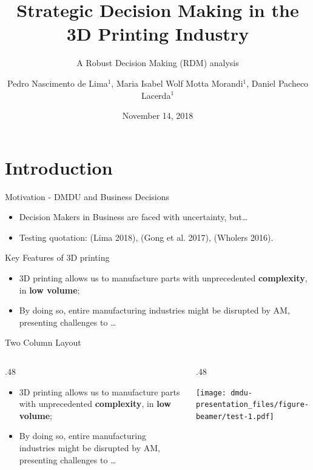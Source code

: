 \documentclass[12pt,ignorenonframetext,]{beamer}
\title{Strategic Decision Making in the 3D Printing Industry}
\subtitle{A Robust Decision Making (RDM) analysis}
\author{Pedro Nascimento de Lima\(^1\), Maria Isabel Wolf Motta Morandi\(^1\),
Daniel Pacheco Lacerda\(^1\)}
\institute{\(^1\) GMAP Research Group, UNISINOS University, RS, Brazil}
\date{November 14, 2018}
\providecommand{\tightlist}{%
  \setlength{\itemsep}{0pt}\setlength{\parskip}{0pt}}
\def\begincols{\begin{columns}}
\def\begincol{\begin{column}}
\def\endcol{\end{column}}
\def\endcols{\end{columns}}
\begin{document}
\frame{\titlepage}

\section{Introduction}\label{introduction}

\begin{frame}{Motivation - DMDU and Business Decisions}

\begin{itemize}
\tightlist
\item
  Decision Makers in Business are faced with uncertainty, but\ldots{}
\item
  Testing quotation: (Lima 2018), (Gong et al. 2017), (Wholers 2016).
\end{itemize}

\end{frame}

\begin{frame}{Key Features of 3D printing}

\begin{itemize}
\tightlist
\item
  3D printing allows us to manufacture parts with unprecedented
  \textbf{complexity}, in \textbf{low volume};
\item
  By doing so, entire manufacturing industries might be disrupted by AM,
  presenting challenges to \ldots{}
\end{itemize}

\end{frame}

\begin{frame}{Two Column Layout}

\begincols
 \begincol{.48\textwidth}

\begin{itemize}
\tightlist
\item
  3D printing allows us to manufacture parts with unprecedented
  \textbf{complexity}, in \textbf{low volume};
\item
  By doing so, entire manufacturing industries might be disrupted by AM,
  presenting challenges to \ldots{}
\end{itemize}

\endcol
\begincol{.48\textwidth}

\texttt{[image: dmdu-presentation\_files/figure-beamer/test-1.pdf]}

\endcol
\endcols

\end{frame}
\end{document}
